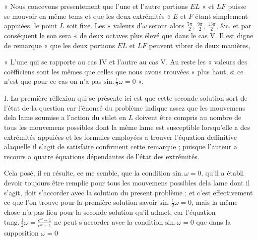 \documentclass[11pt,a4paper]{article}
\begin{document}
« Nous concevons presentement que l'une et l'autre portions $E L$ « et $L F$
puisse se mouvoir en même tems et que les deux extrémités « $E$ et $F$ étant
simplement appuiées, le point $L$ soit fixe. Les « valeurs d'$\omega$ seront
alors $\frac{5\pi}{2}$, $\frac{9\pi}{2}$, $\frac{13\pi}{2}$, \&c. et par
conséquent le son sera « de deux octaves plus élevé que dans le cas V. Il est
digne de remarque « que les deux portions $E L$ et $L F$ peuvent vibrer de
deux manières,



« L'une qui se rapporte au cas IV et l'autre au cas V. Au reste les « valeurs
des coëfficiens sont les mêmes que celles que nous avons trouvées « plus
haut, si ce n'est que pour ce cas on n'a pas
$\text{sin.}\,\frac{1}{2}\omega=0$ ».

I. La première réflexion qui se présente ici est que cette seconde solution
sort de l'état de la question car l'énoncé du problème indique assez que les
mouvemens dela lame soumise a l'action du stilet en $L$ doivent être compris
au nombre de tous les mouvemens possibles dont la même lame est susceptible
lorsqu'elle a des extrémités appuiées et les formules employées a trouver
l'équation deffinitive alaquelle il s'agit de satisfaire confirment cette
remarque ; puisque l'auteur  a recours a  quatre
équations dépendantes de l'état des extrémités.

Cela posé, il en résulte, ce me semble, que la condition
$\text{sin.}\,\omega=0$, qu'il a établi \struck{\ill{}} devoir toujours
 être remplie pour tous les mouvemens possibles dela lame
dont il s'agit, doit s'accorder avec la solution du present problème ; et
c'est effectivement ce que l'on trouve pour la première solution savoir
$\text{sin.}\,\frac{1}{2}\omega=0$, mais la même chose n'a pas lieu pour la
seconde solution qu'il admet, car l'équation
$\text{tang.}\,\frac{1}{2}\omega=\frac{e^{\omega}-1}{e^{\omega}+1}$ ne peut
s'accorder avec la condition $\text{sin.}\,\omega=0$ que dans la supposition
$\omega=0$
\end{document}
